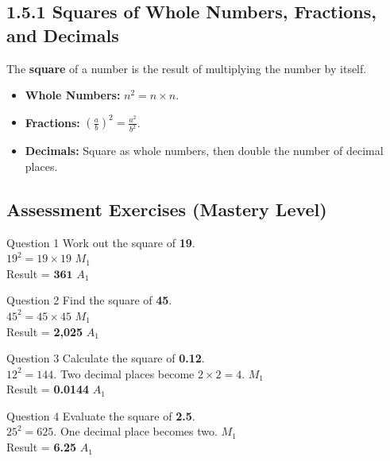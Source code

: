 \documentclass[12pt, a4paper, oneside]{article}
\begin{document}
\subsection*{1.5.1 Squares of Whole Numbers, Fractions, and Decimals}

\begin{tcolorbox}[colback=lightgrey, colframe=primaryblue, title=\textbf{Concept Summary}, arc=5pt]
    The \textbf{square} of a number is the result of multiplying the number by itself. 
    \begin{itemize}
        \item \textbf{Whole Numbers:} $n^2 = n \times n$.
        \item \textbf{Fractions:} $(\frac{a}{b})^2 = \frac{a^2}{b^2}$.
        \item \textbf{Decimals:} Square as whole numbers, then double the number of decimal places.
    \end{itemize}
\end{tcolorbox}

\subsection*{Assessment Exercises (Mastery Level)}

\begin{solvingbox}{Question 1}
Work out the square of \textbf{19}. \\
$19^2 = 19 \times 19$ \hfill $M_1$ \\
Result = $\mathbf{361}$ \hfill $A_1$
\end{solvingbox}

\begin{solvingbox}{Question 2}
Find the square of \textbf{45}. \\
$45^2 = 45 \times 45$ \hfill $M_1$ \\
Result = \textbf{2,025} \hfill $A_1$
\end{solvingbox}

\begin{solvingbox}{Question 3}
Calculate the square of \textbf{0.12}. \\
$12^2 = 144$. Two decimal places become $2 \times 2 = 4$. \hfill $M_1$ \\
Result = \textbf{0.0144} \hfill $A_1$
\end{solvingbox}

\begin{solvingbox}{Question 4}
Evaluate the square of \textbf{2.5}. \\
$25^2 = 625$. One decimal place becomes two. \hfill $M_1$ \\
Result = \textbf{6.25} \hfill $A_1$
\end{solvingbox}
\end{document}
